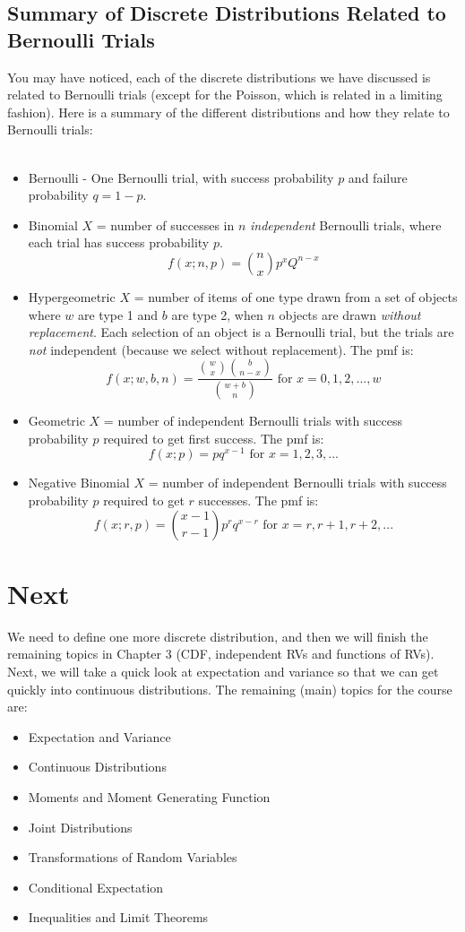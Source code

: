\documentclass[12pt]{article} %
\begin{document}
\subsection{Summary of Discrete Distributions Related to Bernoulli Trials}
You may have noticed, each of the discrete distributions we have discussed is related to Bernoulli trials (except for the Poisson, which is related in a limiting fashion). Here is a summary of the different distributions and how they relate to Bernoulli trials:\\\\
\begin{itemize}
\item Bernoulli - One Bernoulli trial, with success probability $p$ and failure probability $q=1-p$.
\item Binomial $X$ = number of successes in $n$ \emph{independent} Bernoulli trials, where each trial has success probability $p$.
$$f(x;n,p) = {n\choose{x}}p^xQ^{n-x}$$
\item Hypergeometric $X$ = number of items of one type drawn from a set of objects where $w$ are type 1 and $b$ are type 2, when $n$ objects are drawn \emph{without replacement}. Each selection of an object is a Bernoulli trial, but the trials are \emph{not} independent (because we select without replacement). The pmf is:
$$f(x;w,b,n) = \frac{{w\choose{x}}{b\choose{n-x}}}{{{w+b}\choose{n}}} \textrm{ for } x=0,1,2,...,w$$
\item Geometric $X$ = number of independent Bernoulli trials with success probability $p$ required to get first success. The pmf is:
$$f(x;p) = pq^{x-1} \textrm { for } x=1,2,3,...$$
\item Negative Binomial $X$ = number of independent Bernoulli trials with success probability $p$ required to get $r$ successes. The pmf is:
$$f(x;r,p) = {{x-1}\choose{r-1}}p^rq^{x-r} \textrm{ for } x=r,r+1,r+2,...$$
\end{itemize}
\section{Next}
We need to define one more discrete distribution, and then we will finish the remaining topics in Chapter 3 (CDF, independent RVs and functions of RVs). Next, we will take a quick look at expectation and variance so that we can get quickly into continuous distributions. The remaining (main) topics for the course are:
\begin{itemize}
\item Expectation and Variance
\item Continuous Distributions
\item Moments and Moment Generating Function
\item Joint Distributions
\item Transformations of Random Variables
\item Conditional Expectation
\item Inequalities and Limit Theorems
\end{itemize}
\end{document}
